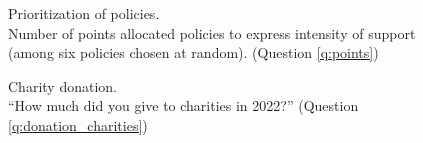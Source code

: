 \documentclass[12pt,english]{article}
\begin{document}
\begin{figure}[h!] %
    \caption[Prioritization of policies]{Prioritization of policies. \\Number of points allocated policies to express intensity of support (among six policies chosen at random). (Question \ref{q:points})}\label{fig:points}
\end{figure}

\begin{figure}[h!] 
    \caption[Charity donation]{Charity donation. \\ ``How much did you give to charities in 2022?'' (Question \ref{q:donation_charities})}\label{fig:donation_charities}
\end{figure}

\end{document}
